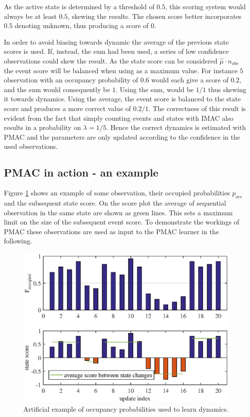 As the active state is determined by a threshold of $0.5$, this scoring system would always be at least $0.5$, skewing the results. The chosen score better incorporates $0.5$ denoting unknown, thus producing a score of $0$. 

In order to avoid biasing towards dynamic the average of the previous state scores is used. If, instead, the sum had been used, a series of low confidence observations could skew the result. As the state score can be considered $\hat{\mu} \cdot n_{obs}$ the event score will be balanced when using as a maximum value. For instance $5$ observation with an occupancy probability of $0.6$ would each give a score of $0.2$, and the sum would consequently be $1$. Using the sum,  would be $1/1$  thus skewing it towards dynamics. Using the average, the event score is balanced to the state score and produces a more correct value of $0.2/1$. The correctness of this result is evident from the fact that simply counting events and states with IMAC also results in a probability on $\lambda = 1/5$. Hence the correct dynamics is estimated with PMAC and the parameters are only updated according to the confidence in the used observations.

\subsection{PMAC in action - an example}
Figure \ref{fig:state_scores_explained} shows an example of some observation, their occupied probabilities $p_{occ}$ and the subsequent state score. On the score plot the average of sequential observation in the same state are shown as green lines. This sets a maximum limit on the size of the subsequent event score. To demonstrate the workings of PMAC these observations are used as input to the PMAC learner in the following. 

\begin{figure} [htbp]
    \centering
    \includegraphics[scale=1]{chapters/mapping_of_dynamic_areas/figures/state_scores_explained}
    \caption{Artificial example of occupancy probabilities used to learn dynamics.}
    \label{fig:state_scores_explained}
\end{figure}


